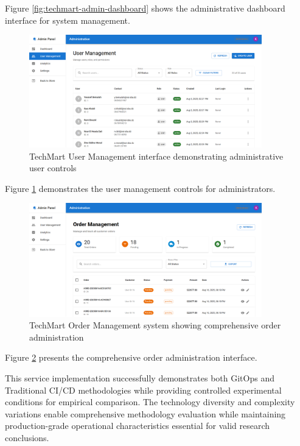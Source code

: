 Figure \ref{fig:techmart-admin-dashboard} shows the administrative dashboard interface for system management.

\begin{figure}[H]
\centering
\includegraphics[width=0.9\textwidth]{figures/chapter5/techmart-user-management.png}
\caption{TechMart User Management interface demonstrating administrative user controls}
\label{fig:techmart-user-management}
\end{figure}

Figure \ref{fig:techmart-user-management} demonstrates the user management controls for administrators.

\begin{figure}[H]
\centering
\includegraphics[width=0.9\textwidth]{figures/chapter5/techmart-order-management.png}
\caption{TechMart Order Management system showing comprehensive order administration}
\label{fig:techmart-order-management}
\end{figure}

Figure \ref{fig:techmart-order-management} presents the comprehensive order administration interface.

This service implementation successfully demonstrates both GitOps and Traditional CI/CD methodologies while providing controlled experimental conditions for empirical comparison. The technology diversity and complexity variations enable comprehensive methodology evaluation while maintaining production-grade operational characteristics essential for valid research conclusions.

